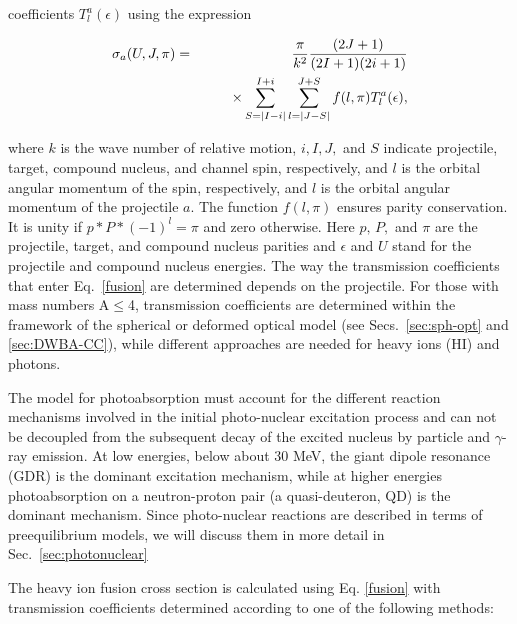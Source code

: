 coefficients $T_{l}^{a}(\epsilon)$ using the expression

\begin{eqnarray}
\sigma_{a}(U,J,\pi) & = &
\frac{\pi}{k^{2}}\frac{(2J+1)}{(2I+1)(2i+1)}  \label{fusion} \\
& & \qquad\times
\sum_{S=|I-i|}^{I+i}\sum_{l=|J-S|}^{J+S}f(l,\pi)T_{l}^{a}(\epsilon),  \notag
\end{eqnarray}

\noindent where $k$ is the wave number of relative motion, $i,I,J,$ and $S$
indicate projectile, target, compound nucleus, and channel spin,
respectively, and $l$ is the orbital angular momentum of the spin,
respectively, and $l$ is the orbital angular momentum of the projectile $a$.
The function $f(l,\pi)$ ensures parity conservation. It is unity if $%
p*P*(-1)^{l}=\pi$ and zero otherwise. Here $p,\, P,$ and $\pi$ are the
projectile, target, and compound nucleus parities and $\epsilon$ and $U$
stand for the projectile and compound nucleus energies. The way the
transmission coefficients that enter Eq.~\ref{fusion} are determined depends
on the projectile. For those with mass numbers A$\leq$4, transmission
coefficients are determined within the framework of the spherical or
deformed optical model (see Secs.~\ref{sec:sph-opt} and \ref{sec:DWBA-CC}),
while different approaches are needed for heavy ions (HI) and photons.

The model for photoabsorption must account for the different reaction
mechanisms involved in the initial photo-nuclear excitation process and can
not be decoupled from the subsequent decay of the excited nucleus by
particle and $\gamma$-ray emission. At low energies, below about 30 MeV, the
giant dipole resonance (GDR) is the dominant excitation mechanism, while at
higher energies photoabsorption on a neutron-proton pair (a quasi-deuteron,
QD) is the dominant mechanism. Since photo-nuclear reactions are described
in terms of preequilibrium models, we will discuss them in more detail in
Sec.~\ref{sec:photonuclear}

The heavy ion fusion cross section is calculated using Eq. \ref{fusion} with
transmission coefficients determined according to one of the following
methods:

